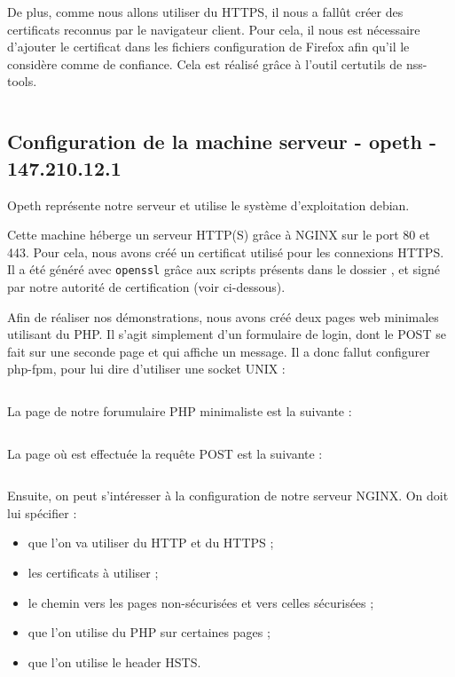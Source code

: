 De plus, comme nous allons utiliser du HTTPS, il nous a fallût créer des certificats reconnus par le navigateur client. Pour cela, il nous est nécessaire d'ajouter le certificat dans les fichiers configuration de Firefox afin qu'il le considère comme de confiance. Cela est réalisé grâce à l'outil certutils de nss-tools.

\inputminted[bgcolor=lbcolor, breaklines]{shell}{../sslstrip2/grave/start.sh}

\subsection{Configuration de la machine serveur - opeth - 147.210.12.1}

Opeth représente notre serveur et utilise le système d'exploitation debian.

Cette machine héberge un serveur HTTP(S) grâce à NGINX sur le port 80 et 443. Pour cela, nous avons créé un certificat utilisé pour les connexions HTTPS. Il a été généré avec \verb+openssl+ grâce aux scripts présents dans le dossier , et signé par notre autorité de certification (voir ci-dessous).

Afin de réaliser nos démonstrations, nous avons créé deux pages web minimales utilisant du PHP. Il s'agit simplement d'un formulaire de login, dont le POST se fait sur une seconde page et qui affiche un message. Il a donc fallut configurer php-fpm, pour lui dire d'utiliser une socket UNIX :

\inputminted[bgcolor=lbcolor, breaklines]{shell}{../sslstrip2/opeth/php7.0-fpm.conf}

La page de notre forumulaire PHP minimaliste est la suivante :

\inputminted[bgcolor=lbcolor, breaklines]{html}{../sslstrip2/opeth/www/local/index.php}

La page où est effectuée la requête POST est la suivante :

\inputminted[bgcolor=lbcolor, breaklines]{php}{../sslstrip2/opeth/www/secure/index.php}

Ensuite, on peut s'intéresser à la configuration de notre serveur NGINX. On doit lui spécifier :

\begin{itemize}
\item que l'on va utiliser du HTTP et du HTTPS ;
\item les certificats à utiliser ;
\item le chemin vers les pages non-sécurisées et vers celles sécurisées ;
\item que l'on utilise du PHP sur certaines pages ;
\item que l'on utilise le header HSTS.
\end{itemize}

